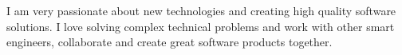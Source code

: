 

\begin{cvparagraph}

I am very passionate about new technologies and creating high quality software solutions.
I love solving complex technical problems and work with other smart engineers, collaborate and create great software products together.
\end{cvparagraph}
